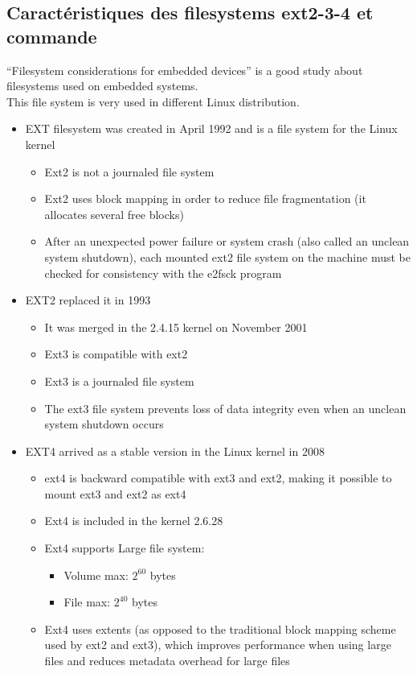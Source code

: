 \documentclass[resume]{subfiles}
\begin{document}
\subsection{Caractéristiques des filesystems ext2-3-4 et commande}
“Filesystem considerations for embedded devices” is a good study about filesystems used on embedded systems.\\
This file system is very used in different Linux distribution.
\begin{itemize}
    \item EXT filesystem was created in April 1992 and is a file system for the Linux kernel
    \begin{itemize}
        \item Ext2 is not a journaled file system
        \item Ext2 uses block mapping in order to reduce file fragmentation (it allocates several free blocks)
        \item After an unexpected power failure or system crash (also called an unclean system shutdown), each mounted ext2 file system on the machine must be checked for consistency with the e2fsck program
    \end{itemize}
    \item EXT2 replaced it in 1993
    \begin{itemize}
        \item It was merged in the 2.4.15 kernel on November 2001
        \item Ext3 is compatible with ext2
        \item Ext3 is a journaled file system
        \item The ext3 file system prevents loss of data integrity even when an
        unclean system shutdown occurs
    \end{itemize}
    \item EXT4 arrived as a stable version in the Linux kernel in 2008
    \begin{itemize}
        \item ext4 is backward compatible with ext3 and ext2, making it possible to mount ext3 and ext2 as ext4
        \item Ext4 is included in the kernel 2.6.28
        \item Ext4 supports Large file system:
        \begin{itemize}
            \item Volume max: $2^{60}$ bytes
            \item File max: $2^{40}$ bytes
        \end{itemize}
        \item Ext4 uses extents (as opposed to the traditional block mapping scheme used by ext2 and ext3), which improves performance when using large files and reduces metadata overhead for large files
    \end{itemize}
\end{itemize}
\end{document}
